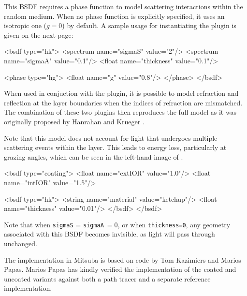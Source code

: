 This BSDF requires a phase function to model scattering interactions within the
random medium. When no phase function is explicitly specified, it uses an
isotropic one ($g=0$) by default. A sample usage for instantiating the
plugin is given on the next page:\newpage
\begin{xml}
<bsdf type="hk">
    <spectrum name="sigmaS" value="2"/>
    <spectrum name="sigmaA" value="0.1"/>
    <float name="thickness" value="0.1"/>

    <phase type="hg">
        <float name="g" value="0.8"/>
    </phase>
</bsdf>
\end{xml}

When used in conjuction with the  plugin, it is possible
to model refraction and reflection at the layer boundaries when the indices
of refraction are mismatched. The combination of these two plugins then
reproduces the full model as it was originally proposed by Hanrahan and
Krueger \cite{Hanrahan1993Reflection}.

Note that this model does not account for light that undergoes multiple
scattering events within the layer. This leads to energy loss,
particularly at grazing angles, which can be seen in the left-hand image of
.

\begin{xml}[caption=A thin dielectric layer with measured ketchup scattering parameters, label=lst:hk-coated]
<bsdf type="coating">
    <float name="extIOR" value="1.0"/>
    <float name="intIOR" value="1.5"/>

    <bsdf type="hk">
        <string name="material" value="ketchup"/>
        <float name="thickness" value="0.01"/>
    </bsdf>
</bsdf>
\end{xml}

Note that when \texttt{sigmaS} = \texttt{sigmaA}$\ = 0$, or when \texttt{thickness=0},
any geometry associated with this BSDF becomes invisible, as light will pass through
unchanged.

The implementation in Mitsuba is based on code by Tom Kazimiers and Marios Papas.
Marios Papas has kindly verified the implementation of the coated and uncoated variants
against both a path tracer and a separate reference implementation.


